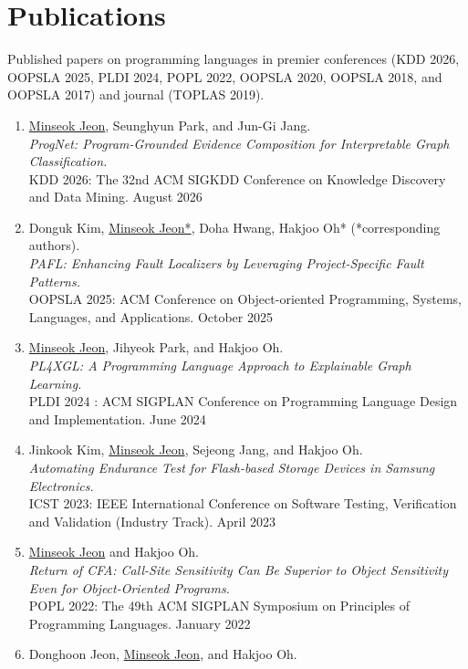 \documentclass[letterpaper,11pt]{article}
\begin{document}
\section{Publications}
Published papers on programming languages in premier conferences
(KDD 2026, OOPSLA 2025, PLDI 2024, POPL 2022, OOPSLA 2020, OOPSLA 2018, and OOPSLA 2017) and
journal (TOPLAS 2019).
\begin{enumerate}
  \item {
    \underline{Minseok Jeon}, Seunghyun Park, and Jun-Gi Jang.\\
    \textit{ProgNet: Program-Grounded Evidence Composition for Interpretable Graph Classification.}\\
    KDD 2026: The 32nd ACM SIGKDD Conference on Knowledge Discovery and Data Mining. August 2026
  }
  \item {
    Donguk Kim, \underline{Minseok Jeon*}, Doha Hwang, Hakjoo Oh* (*corresponding authors).\\
    \textit{PAFL: Enhancing Fault Localizers by Leveraging Project-Specific Fault Patterns.}\\
    OOPSLA 2025: ACM Conference on Object-oriented Programming, Systems, Languages, and Applications. October 2025
  }    
  \item {
    \underline{Minseok Jeon}, Jihyeok Park, and Hakjoo Oh.\\
    \textit{PL4XGL: A Programming Language Approach to Explainable Graph Learning.}\\
    PLDI 2024 : ACM SIGPLAN Conference on Programming Language Design and Implementation. June 2024
  }  
  \item {
    Jinkook Kim, \underline{Minseok Jeon}, Sejeong Jang, and Hakjoo Oh.\\
    \textit{Automating Endurance Test for Flash-based Storage Devices in Samsung Electronics.}\\
    ICST 2023: IEEE International Conference on Software Testing, Verification and Validation (Industry Track). April 2023
  }
  \item{
    \underline{Minseok Jeon} and Hakjoo Oh.\\
    \textit{Return of CFA: Call-Site Sensitivity Can Be Superior to Object Sensitivity Even for
    Object-Oriented Programs.}\\
    POPL 2022: The 49th ACM SIGPLAN Symposium on Principles of Programming Languages. January 2022
  }
  \item{
    Donghoon Jeon, \underline{Minseok Jeon}, and Hakjoo Oh.\\
}
\end{enumerate}
\end{document}
